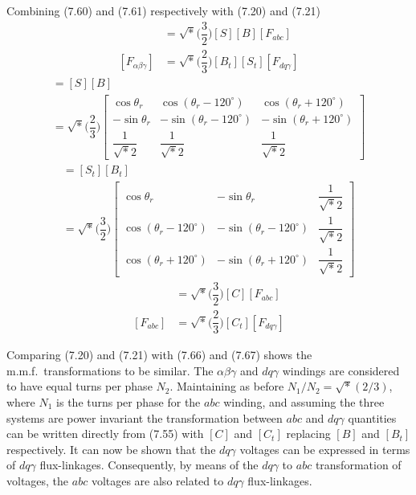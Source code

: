 \documentclass[a4paper,numbers=noenddot,12pt]{scrbook}
\begin{document}
    Combining (7.60) and (7.61) respectively with (7.20) and (7.21)
    \begin{align}
        [F_{d q \gamma}] & = \sqrt*{\Big( \dfrac{3}{2} \Big)} [S] [B] [F_{abc}]\\ 
        [F_{\alpha \beta \gamma}] & = \sqrt*{\Big( \dfrac{2}{3} \Big)} [B_t] [S_t] [F_{d q \gamma}]
        \label{eq:Eq7.63}
    \end{align}
    \begin{multline}
        [C] = [S] [B] \\
        =  \sqrt*{\Big( \dfrac{2}{3} \Big)}
        \begin{bmatrix}
            \cos \theta_r & \cos (\theta_r - 120^{\circ}) & \cos (\theta_r + 120^{\circ}) \\
            - \sin \theta_r & - \sin (\theta_r - 120^{\circ}) & - \sin (\theta_r + 120^{\circ}) \\
            \dfrac{1}{\sqrt*{2}} & \dfrac{1}{\sqrt*{2}} & \dfrac{1}{\sqrt*{2}}
        \end{bmatrix}
        \label{eq:7.64}
    \end{multline}
    \begin{multline}
        [C_t] = [S_t] [B_t] \\
        =  \sqrt*{\Big( \dfrac{3}{2} \Big)}
        \begin{bmatrix}
            \cos \theta_r & -\sin \theta_r & \dfrac{1}{\sqrt*{2}} \\[2ex]
            \cos (\theta_r - 120^{\circ}) & - \sin (\theta_r - 120^{\circ}) & \dfrac{1}{\sqrt*{2}} \\[2ex]
            \cos (\theta_r + 120^{\circ}) & - \sin (\theta_r + 120^{\circ}) & \dfrac{1}{\sqrt*{2}}
        \end{bmatrix}
        \label{eq:Eq.7.65}
    \end{multline}
    \begin{align}
        [F_{d q \gamma}] & = \sqrt*{\Big( \dfrac{3}{2} \Big)} [C] [F_{abc}] \\
        [F_{abc}] & = \sqrt*{\Big( \dfrac{2}{3} \Big)} [C_t] [F_{d q \gamma }]
        \label{eq:Eq7.67}
    \end{align}

    Comparing (7.20) and (7.21) with (7.66) and (7.67) shows the m.m.f.\ transformations to be similar. The $\alpha \beta \gamma$ and $d q \gamma$ windings are considered to have equal turns per phase $N_2$. Maintaining as before $N_1/N_2 = \sqrt*{(2/3)}$, where $N_1$ is the turns per phase for the $abc$ winding, and assuming the three systems are power invariant the transformation between $abc$ and $d q \gamma$ quantities can be written directly from (7.55) with $[C]$ and $[C_t]$ replacing
    $[B]$ and $[B_t]$ respectively.
    It can now be shown that the $dq\gamma$ voltages can be expressed in terms of $dq\gamma$ flux-linkages. Consequently, by means of the $dq\gamma$ to $abc$ transformation of voltages, the $abc$ voltages are also related to $dq\gamma$ flux-linkages.
\end{document}
